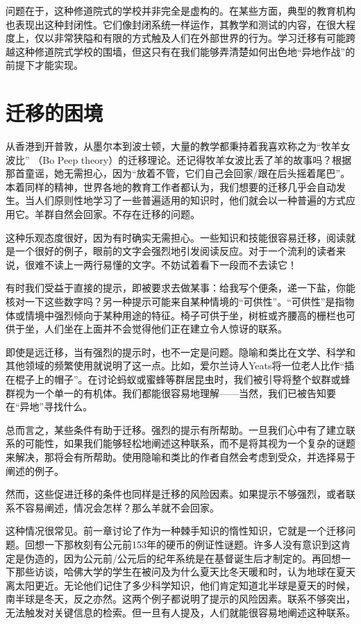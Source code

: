 问题在于，这种修道院式的学校并非完全是虚构的。在某些方面，典型的教育机构也表现出这种封闭性。它们像封闭系统一样运作，其教学和测试的内容，在很大程度上，仅以非常狭隘和有限的方式触及人们在外部世界的行为。学习迁移有可能跨越这种修道院式学校的围墙，但这只有在我们能够弄清楚如何出色地“异地作战”的前提下才能实现。

\section*{迁移的困境}

从香港到开普敦，从墨尔本到波士顿，大量的教学都秉持着我喜欢称之为“牧羊女波比” （Bo Peep theory）的迁移理论。还记得牧羊女波比丢了羊的故事吗？根据那首童谣，她无需担心，因为“放着不管，它们自己会回家/跟在后头摇着尾巴”。本着同样的精神，世界各地的教育工作者都认为，我们想要的迁移几乎会自动发生。当人们原则性地学习了一些普遍适用的知识时，他们就会以一种普遍的方式应用它。羊群自然会回家。不存在迁移的问题。

这种乐观态度很好，因为有时确实无需担心。一些知识和技能很容易迁移，阅读就是一个很好的例子，眼前的文字会强烈地引发阅读反应。对于一个流利的读者来说，很难不读上一两行易懂的文字。不妨试着看下一段而不去读它！

有时我们受益于直接的提示，即被要求去做某事：给我写个便条，递一下盐，你能核对一下这些数字吗？另一种提示可能来自某种情境的“可供性”。“可供性”是指物体或情境中强烈倾向于某种用途的特征。椅子可供于坐，树桩或齐腰高的栅栏也可供于坐，人们坐在上面并不会觉得他们正在建立令人惊讶的联系。

即使是远迁移，当有强烈的提示时，也不一定是问题。隐喻和类比在文学、科学和其他领域的频繁使用就说明了这一点。比如，爱尔兰诗人Yeats将一位老人比作“插在棍子上的帽子”。在讨论蚂蚁或蜜蜂等群居昆虫时，我们被引导将整个蚁群或蜂群视为一个单一的有机体。我们都能很容易地理解——当然，我们已被告知要在“异地”寻找什么。

总而言之，某些条件有助于迁移。强烈的提示有所帮助。一旦我们心中有了建立联系的可能性，如果我们能够轻松地阐述这种联系，而不是将其视为一个复杂的谜题来解决，那将会有所帮助。使用隐喻和类比的作者自然会考虑到受众，并选择易于阐述的例子。

然而，这些促进迁移的条件也同样是迁移的风险因素。如果提示不够强烈，或者联系不容易阐述，情况会怎样？那么羊就不会回家。

这种情况很常见。前一章讨论了作为一种棘手知识的惰性知识，它就是一个迁移问题。回想一下那枚刻有公元前153年的硬币的例证性谜题。许多人没有意识到这肯定是伪造的，因为公元前/公元后的纪年系统是在基督诞生后才制定的。再回想一下那些访谈，哈佛大学的学生在被问及为什么夏天比冬天暖和时，认为地球在夏天离太阳更近。无论他们记住了多少科学知识，他们肯定知道北半球是夏天的时候，南半球是冬天，反之亦然。这两个例子都说明了提示的风险因素。联系不够突出，无法触发对关键信息的检索。但一旦有人提及，人们就能很容易地阐述这种联系。

